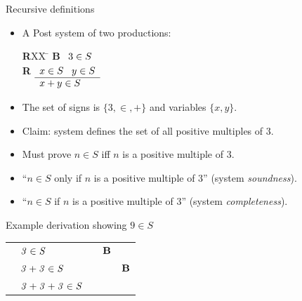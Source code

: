 \documentclass[style=sailor,size=12pt]{powerdot}
\newcommand{\id}[1]{\mbox{\it #1\/}}
\newcommand{\bid}[1]{\mbox{\bf #1}}
\begin{document}
\begin{wideslide}[bm=,toc=]{Recursive definitions}
\begin{itemize}
\item A Post system of two productions:
\vspace{-1em}
\begin{tabbing}
{\bf R}XX \=  \kill
{\bf B} \>
        \(\begin{array}[t]{l}
        3\in S
        \end{array}\) \\[2ex]
{\bf R} \>
        \(\begin{array}[t]{l}
        x \in S \;\;\;y \in S \\
        \hline
        x + y \in S
        \end{array}\)
\end{tabbing}
\item The set of signs is $\{3,\in,+\}$ and variables $\{x,y\}$.
\item Claim: system defines the set of all positive multiples of 3.
\item Must prove $n\in S$ iff $n$ is a positive multiple of 3.
\item ``$n\in S$ only if $n$ is a positive multiple of 3'' (system {\em soundness\/}).
\item ``$n\in S$ if $n$ is a positive multiple of 3'' (system {\em completeness\/}).
\end{itemize}
\end{wideslide}
\begin{wideslide}[bm=,toc=]{Example derivation showing $9 \in S$}
\begin{center}
\begin{tabular}{lllll}
  \onslide{2-}{$\bid{B}$  & $\id{3}\in \id{S}$}           & \onslide{3-}{$\id{3}\in \id{S}$ & $\bid{B}$}
  \onslide{4-}{\\ \cline{2-3}}
  \onslide{5-}{$\bid{R}$  & $\id{3} + \id{3} \in \id{S}$} &                    & \onslide{6-}{$\id{3}\in \id{S}$ & $\bid{B}$} 
  \onslide{7-}{\\ \cline{2-4}} 
  \onslide{8-}{$\bid{R}$  & $\id{3} + \id{3} + \id{3} \in \id{S}$ &           & &  \\} 
\end{tabular}
\end{center}

\end{wideslide}
\end{document}
